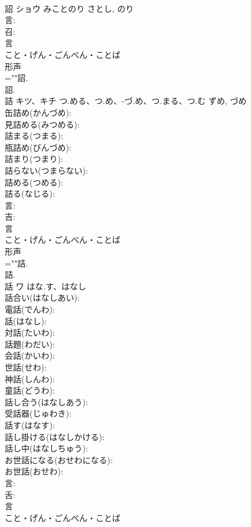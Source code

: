 \documentclass[8pt]{extreport}
\begin{document}
\begin{CJK}{UTF8}{min}
\\	詔	ショウ	みことのり	さとし, のり	
\\	言: 
\\	召: 
\\	言	
\\	こと・げん・ごんべん・ことば	
\\	形声 
\\	=""詔.
\\	詔.
\\	詰	キツ、キチ	つ.める、つ.め、-づ.め、つ.まる、つ.む	ずめ, づめ	
\\	缶詰め(かんづめ): 
\\	見詰める(みつめる): 
\\	詰まる(つまる): 
\\	瓶詰め(びんづめ): 
\\	詰まり(つまり): 
\\	詰らない(つまらない): 
\\	詰める(つめる): 
\\	詰る(なじる): 
\\	言: 
\\	吉: 
\\	言	
\\	こと・げん・ごんべん・ことば	
\\	形声 
\\	=""詰.
\\	詰.
\\	話	ワ	はな.す、はなし		
\\	話合い(はなしあい): 
\\	電話(でんわ): 
\\	話(はなし): 
\\	対話(たいわ): 
\\	話題(わだい): 
\\	会話(かいわ): 
\\	世話(せわ): 
\\	神話(しんわ): 
\\	童話(どうわ): 
\\	話し合う(はなしあう): 
\\	受話器(じゅわき): 
\\	話す(はなす): 
\\	話し掛ける(はなしかける): 
\\	話し中(はなしちゅう): 
\\	お世話になる(おせわになる): 
\\	お世話(おせわ): 
\\	言: 
\\	舌: 
\\	言	
\\	こと・げん・ごんべん・ことば	

\end{CJK}
\end{document}
